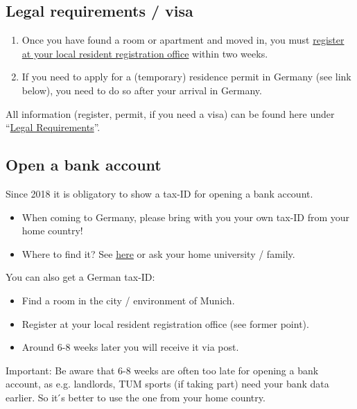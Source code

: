 \documentclass[oneside,final]{book}
\begin{document}
\subsection{Legal requirements / visa}
\begin{enumerate}
  \item Once you have found a room or apartment and moved in, you must \href{https://www.muenchen.de/rathaus/home_en/Department-of-Public-Order/Registration-Deregistration}{register at your local resident
  registration office} within two weeks.
  \item If you need to apply for a (temporary) residence permit in Germany (see link below), you need to do so
  after your arrival in Germany.
\end{enumerate}
All information (register, permit, if you need a visa) can be found here under “\href{http://www.international.tum.de/en/exchangestudents/}{Legal Requirements}”.


\subsection{Open a bank account}
Since 2018 it is obligatory to show a tax-ID for opening a bank account.
\begin{itemize}
  \item When coming to Germany, please bring with you your own tax-ID from your home country!
  \item Where to find it? See \href{http://www.oecd.org/tax/automatic-exchange/crs-implementation-and-assistance/tax-identification-numbers/}{here} or ask your home university / family.
\end{itemize}
You can also get a German tax-ID:
\begin{itemize}
  \item Find a room in the city / environment of Munich.
  \item Register at your local resident registration office (see former point).
  \item Around 6-8 weeks later you will receive it via post.
  
\end{itemize}
Important: Be aware that 6-8 weeks are often too late for opening a bank account, as e.g. landlords, TUM
sports (if taking part) need your bank data earlier. So it ́s better to use the one from your home country.
\end{document}
